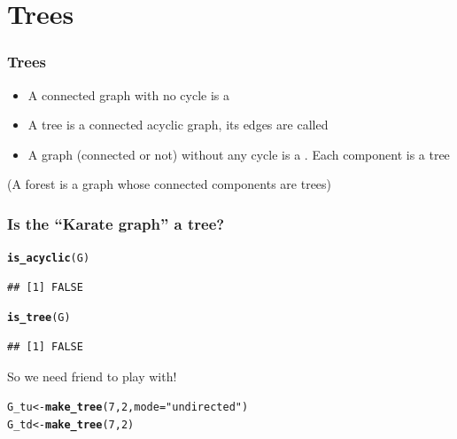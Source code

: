 \documentclass[aspectratio=169]{beamer}\usepackage[]{graphicx}\usepackage[]{xcolor}
\makeatletter
\newcommand{\hlnum}[1]{\textcolor[rgb]{0.686,0.059,0.569}{#1}}%
\newcommand{\hlsng}[1]{\textcolor[rgb]{0.192,0.494,0.8}{#1}}%
\newcommand{\hldef}[1]{\textcolor[rgb]{0.345,0.345,0.345}{#1}}%
\newcommand{\hlkwb}[1]{\textcolor[rgb]{0.69,0.353,0.396}{#1}}%
\newcommand{\hlkwc}[1]{\textcolor[rgb]{0.333,0.667,0.333}{#1}}%
\newcommand{\hlkwd}[1]{\textcolor[rgb]{0.737,0.353,0.396}{\textbf{#1}}}%
\newenvironment{kframe}{%
 \def\at@end@of@kframe{}%
 \ifinner\ifhmode%
  \def\at@end@of@kframe{\end{minipage}}%
  \begin{minipage}{\columnwidth}%
 \fi\fi%
 \def\FrameCommand##1{\hskip\@totalleftmargin \hskip-\fboxsep
 \colorbox{shadecolor}{##1}\hskip-\fboxsep
     \hskip-\linewidth \hskip-\@totalleftmargin \hskip\columnwidth}%
 \MakeFramed {\advance\hsize-\width
   \@totalleftmargin\z@ \linewidth\hsize
   \@setminipage}}%
 {\par\unskip\endMakeFramed%
 \at@end@of@kframe}
\newenvironment{knitrout}{}{} %
\makeatother
\begin{document}
\section{Trees}

\begin{frame}\frametitle{Trees}
	\begin{definition}
	\begin{itemize}
	\item A connected graph with no cycle is a 
	\item A tree is a connected acyclic graph, its edges are called 
	\item A graph (connected or not) without any cycle is a . Each component is a tree
	\end{itemize}
	\end{definition}
	\vfill
	(A forest is a graph whose connected components are trees)
\end{frame}

\begin{frame}[fragile]\frametitle{Is the ``Karate graph'' a tree?}
\begin{knitrout}
\color{fgcolor}\begin{kframe}
\begin{alltt}
\hlkwd{is_acyclic}\hldef{(G)}
\end{alltt}
\begin{verbatim}
## [1] FALSE
\end{verbatim}
\begin{alltt}
\hlkwd{is_tree}\hldef{(G)}
\end{alltt}
\begin{verbatim}
## [1] FALSE
\end{verbatim}
\end{kframe}
\end{knitrout}
\vfill
So we need friend to play with!
\vfill
\begin{knitrout}
\color{fgcolor}\begin{kframe}
\begin{alltt}
\hldef{G_tu} \hlkwb{<-} \hlkwd{make_tree}\hldef{(}\hlnum{7}\hldef{,} \hlnum{2}\hldef{,} \hlkwc{mode} \hldef{=} \hlsng{"undirected"}\hldef{)}
\hldef{G_td} \hlkwb{<-} \hlkwd{make_tree}\hldef{(}\hlnum{7}\hldef{,} \hlnum{2}\hldef{)}
\end{alltt}
\end{kframe}
\end{knitrout}
\end{frame}
\end{document}
